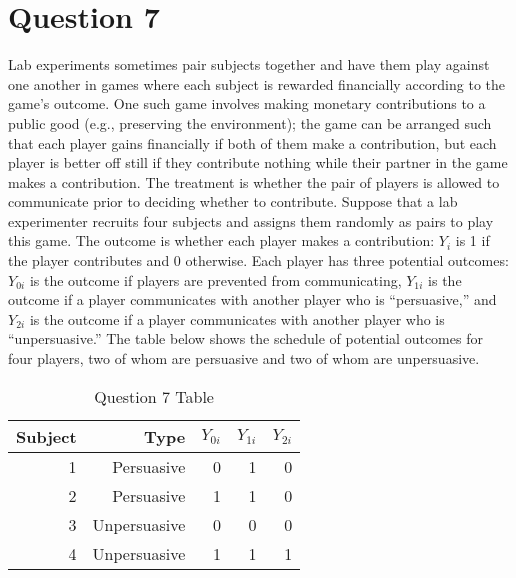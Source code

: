 \documentclass[11pt,notitlepage]{article}\usepackage[]{graphicx}\usepackage[]{color}
\begin{document}
\section*{Question 7}
Lab experiments sometimes pair subjects together and have them play against one another in games where each subject is rewarded financially according to the game's outcome. One such game involves making monetary contributions to a public good (e.g., preserving the environment); the game can be arranged such that each player gains financially if both of them make a contribution, but each player is better off still if they contribute nothing while their partner in the game makes a contribution. The treatment is whether the pair of players is allowed to communicate prior to deciding whether to contribute. Suppose that a lab experimenter recruits four subjects and assigns them randomly as pairs to play this game. The outcome is whether each player makes a contribution: $Y_i$ is 1 if the player contributes and 0 otherwise. Each player has three potential outcomes: $Y_{0i}$ is the outcome if players are prevented from communicating, $Y_{1i}$ is the outcome if a player communicates with another player who is ``persuasive,'' and $Y_{2i}$ is the outcome if a player communicates with another player who is ``unpersuasive.'' The table below shows the schedule of potential outcomes for four players, two of whom are persuasive and two of whom are unpersuasive.

\begin{table}[H]
  \centering
  \caption{Question 7 Table}
    \begin{tabular}{rrrrr}
    \toprule
    Subject  & Type  & $Y_{0i}$   & $Y_{1i}$   & $Y_{2i}$  \\
    \midrule
    1     & Persuasive  & 0     & 1     & 0 \\
    2     & Persuasive  & 1     & 1     & 0 \\
    3     & Unpersuasive  & 0     & 0     & 0 \\
    4     & Unpersuasive  & 1     & 1     & 1 \\
    \bottomrule
    \end{tabular}%
  \label{tab:addlabel}%
\end{table}%
\end{document}
